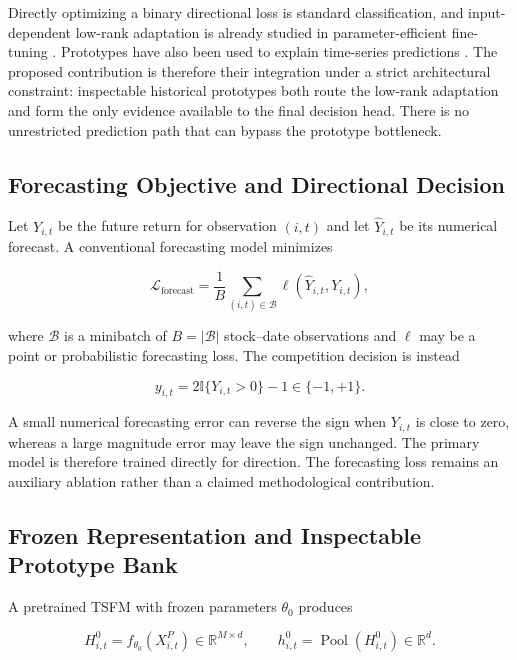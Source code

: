 \documentclass[11pt]{article}
\newcommand{\R}{\mathbb{R}}
\newcommand{\ind}{\mathbb{I}}
\begin{document}
Directly optimizing a binary directional loss is standard classification, and
input-dependent low-rank adaptation is already studied in parameter-efficient
fine-tuning \citep{toplora}. Prototypes have also been used to explain
time-series predictions \citep{obermair2023prototype}. The proposed
contribution is therefore their integration under a strict architectural
constraint: inspectable historical prototypes both route the low-rank
adaptation and form the only evidence available to the final decision head.
There is no unrestricted prediction path that can bypass the prototype
bottleneck.

\subsection{Forecasting Objective and Directional Decision}

Let $Y_{i,t}$ be the future return for observation $(i,t)$ and let
$\widehat Y_{i,t}$ be its numerical forecast. A conventional forecasting model
minimizes

\begin{equation}
\mathcal L_{\mathrm{forecast}}
=
\frac{1}{B}
\sum_{(i,t)\in\mathcal B}
\ell\left(\widehat Y_{i,t},Y_{i,t}\right),
\end{equation}

where $\mathcal B$ is a minibatch of $B=|\mathcal B|$ stock--date observations
and $\ell$ may be a point or probabilistic forecasting loss. The competition
decision is instead

\begin{equation}
y_{i,t}
=
2\ind\{Y_{i,t}>0\}-1
\in\{-1,+1\}.
\end{equation}

A small numerical forecasting error can reverse the sign when $Y_{i,t}$ is
close to zero, whereas a large magnitude error may leave the sign unchanged.
The primary model is therefore trained directly for direction. The forecasting
loss remains an auxiliary ablation rather than a claimed methodological
contribution.

\subsection{Frozen Representation and Inspectable Prototype Bank}

A pretrained TSFM with frozen parameters $\theta_0$ produces

\begin{equation}
H^0_{i,t}
=
f_{\theta_0}(X^P_{i,t})
\in\R^{M\times d},
\qquad
h^0_{i,t}
=
\operatorname{Pool}(H^0_{i,t})
\in\R^d.
\end{equation}
\end{document}
